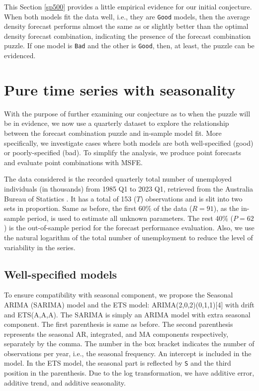 \documentclass{monashthesis}
\begin{document}
This Section \ref{sp500} provides a little empirical evidence for our initial conjecture. When both models fit the data well, i.e., they are \texttt{Good} models, then the average density forecast performs almost the same as or slightly better than the optimal density forecast combination, indicating the presence of the forecast combination puzzle. If one model is \texttt{Bad} and the other is \texttt{Good}, then, at least, the puzzle can be evidenced.

\hypertarget{pure-time-series-with-seasonality}{%
\section{Pure time series with seasonality}\label{pure-time-series-with-seasonality}}

With the purpose of further examining our conjecture as to when the puzzle will be in evidence, we now use a quarterly dataset to explore the relationship between the forecast combination puzzle and in-sample model fit. More specifically, we investigate cases where both models are both well-specified (good) or poorly-specified (bad). To simplify the analysis, we produce point forecasts and evaluate point combinations with MSFE.

The data considered is the recorded quarterly total number of unemployed individuals (in thousands) from 1985 Q1 to 2023 Q1, retrieved from the Australia Bureau of Statistics \autocite{ABS}. It has a total of 153 (\(T\)) observations and is slit into two sets in proportion. Same as before, the first 60\% of the data (\(R = 91\)), as the in-sample period, is used to estimate all unknown parameters. The rest 40\% (\(P = 62\)) is the out-of-sample period for the forecast performance evaluation. Also, we use the natural logarithm of the total number of unemployment to reduce the level of variability in the series.

\hypertarget{well-specified-models}{%
\subsection{Well-specified models}\label{well-specified-models}}

To ensure compatibility with seasonal component, we propose the Seasonal ARIMA (SARIMA) model and the ETS model: ARIMA(2,0,2)(0,1,1){[}4{]} with drift and ETS(A,A,A). The SARIMA is simply an ARIMA model with extra seasonal component. The first parenthesis is same as before. The second parenthesis represents the seasonal AR, integrated, and MA components respectively, separately by the comma. The number in the box bracket indicates the number of observations per year, i.e., the seasonal frequency. An intercept is included in the model. In the ETS model, the seasonal part is reflected by \texttt{S} and the third position in the parenthesis. Due to the log transformation, we have additive error, additive trend, and additive seasonality.
\end{document}
